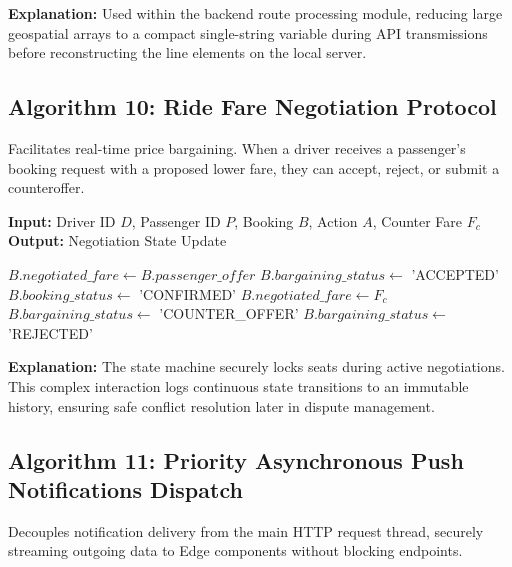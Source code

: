 \textbf{Explanation:} Used within the backend route processing module, reducing large geospatial arrays to a compact single-string variable during API transmissions before reconstructing the line elements on the local server.

\subsection{Algorithm 10: Ride Fare Negotiation Protocol}

Facilitates real-time price bargaining. When a driver receives a passenger's booking request with a proposed lower fare, they can accept, reject, or submit a counteroffer.

\begin{algorithm}[H]
\caption{Ride Fare Negotiation State Machine}
\textbf{Input:} Driver ID $D$, Passenger ID $P$, Booking $B$, Action $A$, Counter Fare $F_c$ \\
\textbf{Output:} Negotiation State Update
\begin{algorithmic}[1]
        \State $B.negotiated\_fare \gets B.passenger\_offer$
        \State $B.bargaining\_status \gets$ 'ACCEPTED'
        \State $B.booking\_status \gets$ 'CONFIRMED'
        \State $B.negotiated\_fare \gets F_c$
        \State $B.bargaining\_status \gets$ 'COUNTER\_OFFER'
        \State $B.bargaining\_status \gets$ 'REJECTED'
        \State {}
    \EndIf
    \State {}
    \State {}
    \State {}
\EndFunction
\end{algorithmic}
\end{algorithm}

\textbf{Explanation:} The state machine securely locks seats during active negotiations. This complex interaction logs continuous state transitions to an immutable history, ensuring safe conflict resolution later in dispute management.

\subsection{Algorithm 11: Priority Asynchronous Push Notifications Dispatch}

Decouples notification delivery from the main HTTP request thread, securely streaming outgoing data to Edge components without blocking endpoints.

